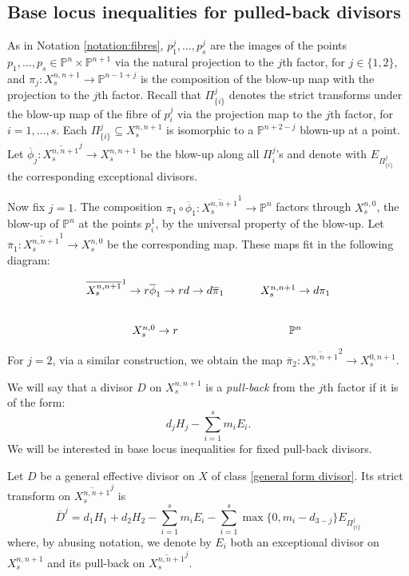 \documentclass[a4paper,11pt]{article}
\newcommand{\PP}{\mathbb P}
\newcommand{\arrow}{\rightarrow}
\begin{document}

\subsection{Base locus inequalities for pulled-back divisors}

As in Notation \ref{notation:fibres}, $p_1^j,\dots,p_s^j$ are the images of the  points $p_1,\dots,p_s\in\PP^n\times\PP^{n+1}$ via the natural projection  to the $j$th factor, for $j\in\{1,2\}$, and  $\pi_j:X^{n,n+1}_s\to\PP^{n-1+j}$ is the composition of the blow-up map with the projection to the $j$th factor. Recall that  $\Pi_{\{i\}}^j$ denotes the strict transforms under the blow-up map of the fibre of $p_i^j$ via the projection map to the $j$th factor, for $i=1,\dots,s$. 
 Each $\Pi_{\{i\}}^j\subseteq X^{n,n+1}_s$ is isomorphic to a $\PP^{n+2-j}$ blown-up at a point.
Let $\overline{\phi}_j:\overline{X^{n,n+1}_s}^j\to X^{n,n+1}_{s}$ be the blow-up along all $\Pi_i^j$'s and denote with $E_{\Pi^j_{\{i\}}}$ the corresponding exceptional divisors.

Now fix $j=1$.
The composition $\pi_1\circ\overline{\phi}_1:\overline{X^{n,n+1}_s}^1\to\PP^n$ factors through $X^{n,0}_{s}$,  the blow-up of $\PP^n$ at the points $p_i^1$, by the universal property of the blow-up.
Let $\overline{\pi}_1: \overline{X^{n,n+1}_{s}}^1 \to X^{n,0}_{s}$ be the corresponding map. These maps fit in the following diagram:
\[\begin{tikzcd}
\overline{X^{n,n+1}_s}^1  \arrow{r}{\overline{\phi}_1} 
\arrow{rd}  \arrow{d}{\overline{\pi}_1}
& X^{n,n+1}_{s} \arrow{d}{\pi_1}  \\
 X^{n,0}_{s} \arrow{r}{} & \PP^n
\end{tikzcd}
\]
For $j=2$, via a similar construction, we obtain the map $\overline{\pi}_2: \overline{X^{n,n+1}_{s}}^2 \to X^{0,n+1}_{s}$.


We will say that a divisor $D$ on $X^{n,n+1}_s$ is a \emph{pull-back} from the $j$th factor if it is of the form:
$$
d_jH_j-\sum_{i=1}^s m_i E_i.
$$
We will be interested in base locus inequalities for fixed pull-back divisors. 

Let $D$ be a general effective divisor on $X$ of class \eqref{general form divisor}. Its strict transform on $\overline{X^{n,n+1}_{s}}^j$ is
\begin{equation}\label{strict-transform-on-overlineX} 
\overline{D}^j=d_1H_1+d_2H_2-\sum_{i=1}^sm_iE_i-\sum_{i=1}^s\max\{0,m_i-d_{3-j}\}E_{\Pi_{\{i\}}^j} 
\end{equation}
where, by abusing notation, we denote by $E_i$ both an exceptional divisor on ${X}^{n,n+1}_s$ and its pull-back on $\overline{X^{n,n+1}_{s}}^j$.
\end{document}
